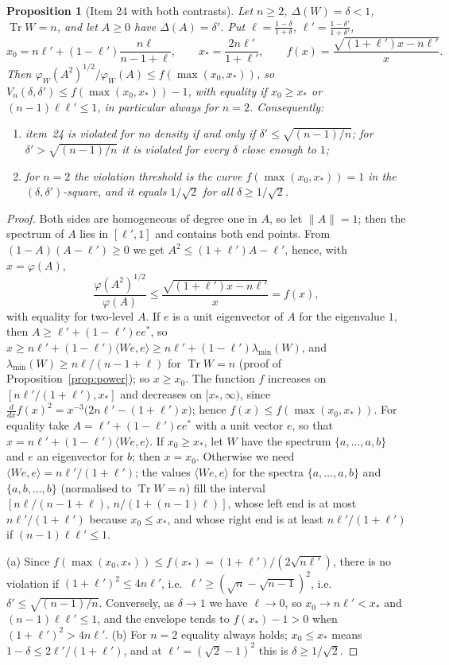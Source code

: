\documentclass[11pt]{article}
\DeclareMathOperator{\Tr}{Tr}
\theoremstyle{plain}
\newtheorem{proposition}[theorem]{Proposition}
\theoremstyle{definition}
\theoremstyle{remark}
\begin{document}
\begin{proposition}[Item 24 with both contrasts]\label{prop:item24}
Let $n\ge2$, $\Delta(W)=\delta<1$, $\Tr W=n$, and let $A\ge0$ have $\Delta(A)=\delta'$. Put $\ell=\frac{1-\delta}{1+\delta}$,
$\ell'=\frac{1-\delta'}{1+\delta'}$,
\[
  x_0=n\ell'+(1-\ell')\frac{n\ell}{n-1+\ell},\qquad x_*=\frac{2n\ell'}{1+\ell'},\qquad
  f(x)=\frac{\sqrt{(1+\ell')x-n\ell'}}x .
\]
Then $\varphi_W(A^2)^{1/2}/\varphi_W(A)\le f(\max(x_0,x_*))$, so $V_n(\delta,\delta')\le f(\max(x_0,x_*))-1$, with equality
if $x_0\ge x_*$ or $(n-1)\ell\ell'\le1$, in particular always for $n=2$. Consequently:
\begin{enumerate}
\item[(a)] item~24 is violated for no density if and only if $\delta'\le\sqrt{(n-1)/n}$; for $\delta'>\sqrt{(n-1)/n}$ it is
violated for every $\delta$ close enough to $1$;
\item[(b)] for $n=2$ the violation threshold is the curve $f(\max(x_0,x_*))=1$ in the $(\delta,\delta')$-square, and it equals
$1/\sqrt2$ for all $\delta\ge1/\sqrt2$.
\end{enumerate}
\end{proposition}
\begin{proof}
Both sides are homogeneous of degree one in $A$, so let $\|A\|=1$; then the spectrum of $A$ lies in $[\ell',1]$ and contains
both end points. From $(1-A)(A-\ell')\ge0$ we get $A^2\le(1+\ell')A-\ell'$, hence, with $x=\varphi(A)$,
\[
  \frac{\varphi(A^2)^{1/2}}{\varphi(A)}\le\frac{\sqrt{(1+\ell')x-n\ell'}}x=f(x),
\]
with equality for two-level $A$. If $e$ is a unit eigenvector of $A$ for the eigenvalue $1$, then $A\ge\ell'+(1-\ell')ee^*$,
so $x\ge n\ell'+(1-\ell')\langle We,e\rangle\ge n\ell'+(1-\ell')\lambda_{\min}(W)$, and $\lambda_{\min}(W)\ge n\ell/(n-1+\ell)$
for $\Tr W=n$ (proof of Proposition~\ref{prop:power}); so $x\ge x_0$. The function $f$ increases on $[n\ell'/(1+\ell'),x_*]$
and decreases on $[x_*,\infty)$, since $\frac d{dx}f(x)^2=x^{-3}\bigl(2n\ell'-(1+\ell')x\bigr)$; hence $f(x)\le f(\max(x_0,x_*))$.
For equality take $A=\ell'+(1-\ell')ee^*$ with a unit vector $e$, so that $x=n\ell'+(1-\ell')\langle We,e\rangle$. If
$x_0\ge x_*$, let $W$ have the spectrum $\{a,\dots,a,b\}$ and $e$ an eigenvector for $b$; then $x=x_0$. Otherwise we need
$\langle We,e\rangle=n\ell'/(1+\ell')$; the values $\langle We,e\rangle$ for the spectra $\{a,\dots,a,b\}$ and
$\{a,b,\dots,b\}$ (normalised to $\Tr W=n$) fill the interval $[n\ell/(n-1+\ell),\,n/(1+(n-1)\ell)]$, whose left end is
at most $n\ell'/(1+\ell')$ because $x_0\le x_*$, and whose right end is at least $n\ell'/(1+\ell')$ if $(n-1)\ell\ell'\le1$.

(a) Since $f(\max(x_0,x_*))\le f(x_*)=(1+\ell')/(2\sqrt{n\ell'})$, there is no violation if $(1+\ell')^2\le4n\ell'$, i.e.\
$\ell'\ge(\sqrt n-\sqrt{n-1})^2$, i.e.\ $\delta'\le\sqrt{(n-1)/n}$. Conversely, as $\delta\to1$ we have $\ell\to0$, so
$x_0\to n\ell'<x_*$ and $(n-1)\ell\ell'\le1$, and the envelope tends to $f(x_*)-1>0$ when $(1+\ell')^2>4n\ell'$. (b) For $n=2$
equality always holds; $x_0\le x_*$ means $1-\delta\le2\ell'/(1+\ell')$, and at $\ell'=(\sqrt2-1)^2$ this is
$\delta\ge1/\sqrt2$.
\end{proof}
\end{document}
